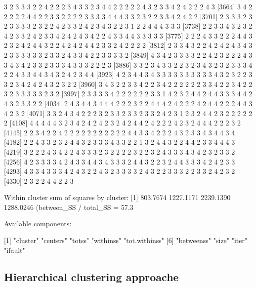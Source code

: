 \begin{Schunk}
\begin{Soutput}
[3627] 3 2 3 3 3 2 2 4 2 2 2 3 4 3 3 2 3 4 4 2 2 2 2 2 4 3 2 3 3 4 2 4 2 2 2 4 3
[3664] 3 4 2 2 2 2 2 4 4 2 2 3 3 2 2 2 2 3 3 3 3 4 4 4 3 3 2 3 2 2 3 3 4 2 4 2 2
[3701] 2 3 3 3 2 3 2 3 3 3 3 2 3 2 2 4 2 3 3 2 4 2 3 4 3 2 2 3 1 2 2 4 4 4 3 3 3
[3738] 2 2 3 3 4 3 2 3 2 4 2 3 3 2 4 2 3 3 4 2 4 2 4 3 4 2 2 4 3 3 4 4 3 3 3 3 3
[3775] 2 2 2 4 3 3 2 2 2 4 4 3 2 3 2 4 2 4 4 3 2 2 4 2 4 2 4 4 2 3 3 2 4 2 2 2 2
[3812] 2 3 3 4 3 2 2 4 2 4 2 4 3 4 3 2 3 3 3 3 3 3 2 3 3 2 4 3 3 4 2 2 3 3 3 3 2
[3849] 4 3 4 2 3 3 3 3 2 2 4 2 3 2 2 2 4 3 3 4 3 4 2 3 3 2 3 3 3 4 3 3 3 2 2 2 3
[3886] 3 3 2 3 4 3 3 2 2 3 2 3 4 3 2 3 2 3 3 3 4 2 2 4 3 3 4 4 3 4 3 2 4 2 3 4 4
[3923] 4 2 3 4 4 3 4 3 3 3 3 3 3 3 3 3 3 4 3 2 3 2 2 3 3 2 3 4 2 4 2 4 3 2 3 2 2
[3960] 3 4 3 2 2 3 3 4 2 2 3 4 2 2 2 2 2 2 3 3 4 2 2 3 4 2 2 3 2 3 3 3 3 3 2 3 2
[3997] 2 3 3 3 3 4 2 2 2 2 2 2 3 3 1 4 2 3 2 4 4 2 4 4 3 3 3 4 4 2 4 3 2 3 3 2 2
[4034] 2 4 3 4 4 3 4 4 4 2 2 2 3 2 2 4 4 4 2 4 2 2 2 4 2 4 4 2 2 2 4 4 3 4 2 3 2
[4071] 3 3 2 4 3 4 2 2 2 3 2 3 3 2 3 3 2 3 3 2 4 2 3 1 2 3 2 4 4 2 3 2 2 2 2 2 2
[4108] 4 4 4 4 4 3 2 3 4 2 4 2 4 2 3 2 4 2 4 4 2 4 2 2 2 4 2 3 2 4 4 4 2 2 2 3 2
[4145] 2 2 3 4 2 2 4 2 2 2 2 2 2 2 2 2 2 2 4 4 3 3 4 2 2 2 4 3 2 3 3 4 3 4 4 3 4
[4182] 2 2 4 3 3 2 3 2 4 4 3 2 3 3 3 4 3 3 2 2 1 3 2 4 4 3 2 2 4 4 2 3 3 4 4 4 3
[4219] 3 2 2 2 4 3 4 2 2 4 3 3 3 2 3 2 2 2 2 3 2 2 3 2 4 3 3 3 4 3 4 2 3 2 3 3 2
[4256] 4 2 3 3 3 3 4 2 4 3 3 4 4 3 4 3 3 3 2 4 4 3 2 2 3 2 4 4 3 3 3 4 2 4 2 3 3
[4293] 4 3 3 4 3 3 3 4 2 4 3 2 2 4 3 2 3 3 3 3 2 4 3 2 2 3 3 3 2 2 3 3 2 4 2 3 2
[4330] 2 3 2 2 4 4 2 2 3

Within cluster sum of squares by cluster:
[1]  803.7674 1227.1171 2239.1390 1288.0246
 (between_SS / total_SS =  57.3 %)

Available components:

[1] "cluster"      "centers"      "totss"        "withinss"     "tot.withinss"
[6] "betweenss"    "size"         "iter"         "ifault"      
\end{Soutput}
\end{Schunk}

\begin{Schunk}
\end{Schunk}

\hypertarget{hierarchical-clustering-approache}{%
\subsection{Hierarchical clustering
approache}\label{hierarchical-clustering-approache}}

